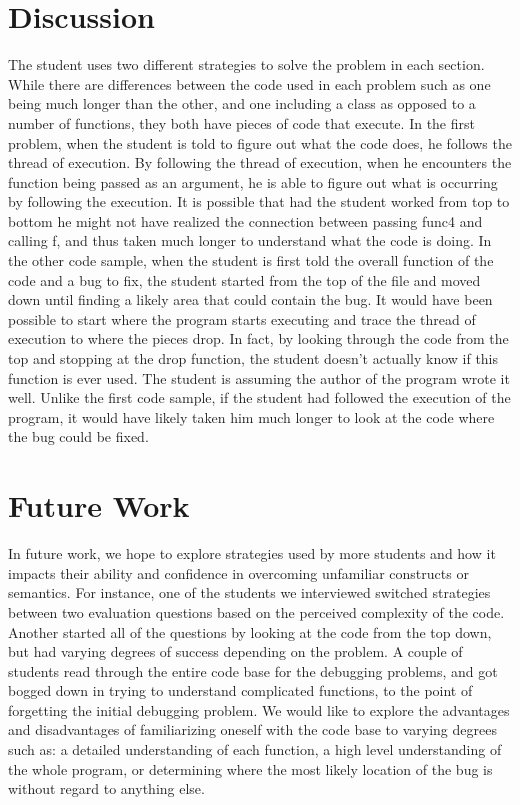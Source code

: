 \documentclass{article}
\begin{document}
\section{Discussion}
The student uses two different strategies to solve the problem in each section. While there are differences between the code used in each problem such as one being much longer than the other, and one including a class as opposed to a number of functions, they both have pieces of code that execute. In the first problem, when the student is told to figure out what the code does, he follows the thread of execution. By following the thread of execution, when he encounters the function being passed as an argument, he is able to figure out what is occurring by following the execution. It is possible that had the student worked from top to bottom he might not have realized the connection between passing func4 and calling f, and thus taken much longer to understand what the code is doing. In the other code sample, when the student is first told the overall function of the code and a bug to fix, the student started from the top of the file and moved down until finding a likely area that could contain the bug. It would have been possible to start where the program starts executing and trace the thread of execution to where the pieces drop. In fact, by looking through the code from the top and stopping at the drop function, the student doesn't actually know if this function is ever used. The student is assuming the author of the program wrote it well.  Unlike the first code sample, if the student had followed the execution of the program, it would have likely taken him much longer to look at the code where the bug could be fixed.

\section{Future Work}
In future work, we hope to explore strategies used by more students and how it impacts their ability and confidence in overcoming unfamiliar constructs or semantics.
For instance, one of the students we interviewed switched strategies between two evaluation questions based on the perceived complexity of the code.
Another started all of the questions by looking at the code from the top down, but had varying degrees of success depending on the problem.
A couple of students read through the entire code base for the debugging problems, and got bogged down in trying to understand complicated functions, to the point of forgetting the initial debugging problem. We would like to explore the advantages and disadvantages of familiarizing oneself with the code base to varying degrees such as: a detailed understanding of each function,  a high level understanding of the whole program, or determining where the most likely location of the bug is without regard to anything else.
\end{document}

